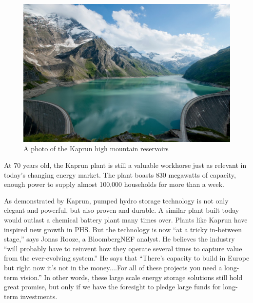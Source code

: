 \documentclass[hidelinks,12pt,a4paper]{article}
\begin{document}

\begin{figure}[ht!]
    \centering
    \includegraphics[width=1\textwidth]{kaprun-hydroelectric-station-photo.jpeg}
    \caption{A photo of the Kaprun high mountain reservoirs \cite{MostBeautifulBattery}}
\end{figure}
\FloatBarrier

At 70 years old, the Kaprun plant is still a valuable workhorse just as relevant in today's changing energy market. The plant boasts 830 megawatts of capacity, enough power to supply almost 100,000 households for more than a week. \cite{MostBeautifulBattery}

As demonstrated by Kaprun, pumped hydro storage technology is not only elegant and powerful, but also proven and durable. A similar plant built today would outlast a chemical battery plant many times over. Plants like Kaprun have inspired new growth in PHS. But the technology is now “at a tricky in-between stage,” says Jonas Rooze, a BloombergNEF analyst. \cite{MostBeautifulBattery} He believes the industry “will probably have to reinvent how they operate several times to capture value from the ever-evolving system.” \cite{MostBeautifulBattery} He says that “There’s capacity to build in Europe but right now it’s not in the money....For all of these projects you need a long-term vision.” \cite{MostBeautifulBattery} In other words, these large scale energy storage solutions still hold great promise, but only if we have the foresight to pledge large funds for long-term investments.
\end{document}
